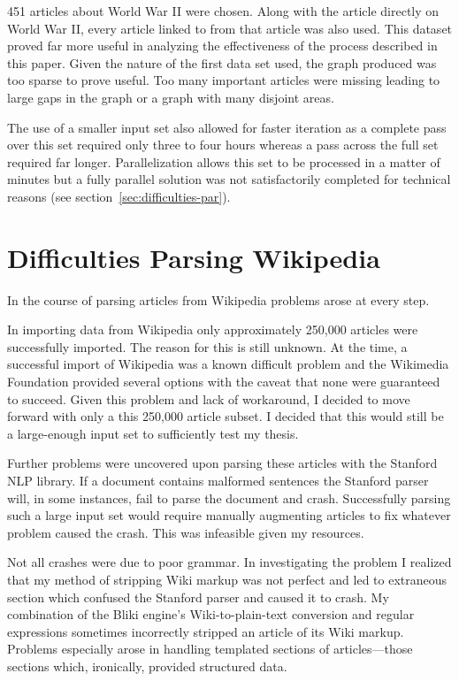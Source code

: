 451 articles about World War II were chosen.  Along with the article directly on World War II, every article linked to from that article was also used.  This dataset proved far more useful in analyzing the effectiveness of the process described in this paper.  Given the nature of the first data set used, the graph produced was too sparse to prove useful.  Too many important articles were missing leading to large gaps in the graph or a graph with many disjoint areas.  

The use of a smaller input set also allowed for faster iteration as a complete pass over this set required only three to four hours whereas a pass across the full set required far longer.  Parallelization allows this set to be processed in a matter of minutes but a fully parallel solution was not satisfactorily completed for technical reasons (see section~\ref{sec:difficulties-par}).

\section{Difficulties Parsing Wikipedia}

In the course of parsing articles from Wikipedia problems arose at every step.

In importing data from Wikipedia only approximately 250,000 articles were successfully imported.   The reason for this is still unknown.  At the time, a successful import of Wikipedia was a known difficult problem and the Wikimedia Foundation provided several options with the caveat that none were guaranteed to succeed.  Given this problem and lack of workaround, I decided to move forward with only a this 250,000 article subset.  I decided that this would still be a large-enough input set to sufficiently test my thesis.

Further problems were uncovered upon parsing these articles with the Stanford NLP library.  If a document contains malformed sentences the Stanford parser will, in some instances, fail to parse the document and crash.  Successfully parsing such a large input set would require manually augmenting articles to fix whatever problem caused the crash.  This was infeasible given my resources.  

Not all crashes were due to poor grammar.  In investigating the problem I realized that my method of stripping Wiki markup was not perfect and led to extraneous section which confused the Stanford parser and caused it to crash.  My combination of the Bliki engine's Wiki-to-plain-text conversion and regular expressions sometimes incorrectly stripped an article of its Wiki markup.  Problems especially arose in handling templated sections of articles---those sections which, ironically, provided structured data.  

